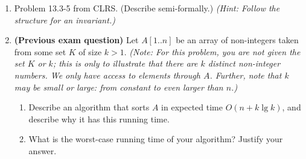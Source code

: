 \documentclass{article}
\begin{document}
\begin{enumerate}
\item Problem 13.3-5 from CLRS. (Describe semi-formally.) \emph{(Hint: Follow the structure for an invariant.)}


\item \textbf{(Previous exam question)} Let $A[1..n]$ be an array of non-integers taken from some set $K$ of size $k>1$. \emph{(Note: For this problem, you are not given the set $K$ or $k$; this is only to illustrate that there are $k$ distinct non-integer numbers. We only have access to elements through $A$. Further, note that $k$ may be small or large: from constant to even larger than $n$.)}
\begin{enumerate}
\item Describe an algorithm that sorts $A$ in expected time $O(n + k\lg k)$, and describe why it has this running time. 

\item What is the worst-case running time of your algorithm? Justify your answer.
\end{enumerate}

\end{enumerate}
\end{document}
